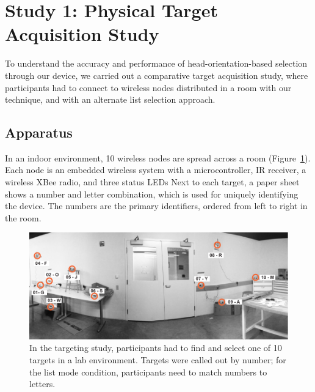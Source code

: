 \section{Study 1: Physical Target Acquisition Study}
To understand the accuracy and performance of head-orientation-based selection through our device, we carried out a comparative target acquisition study, where participants had to connect to wireless nodes distributed in a room with our technique, and with an alternate list selection approach.


\subsection{Apparatus}
In an indoor environment, 10 wireless nodes are spread across a room (Figure~\ref{fig:targeting-study-layout}). Each node is an embedded wireless system with a microcontroller, IR receiver, a wireless XBee radio, and three status LEDs %
Next to each target, a paper sheet shows a number and letter combination, which is used for uniquely identifying the device. The numbers are the primary identifiers, ordered from left to right in the room. 

\begin{figure}[t]
\centering
\includegraphics[width=1.0\columnwidth]{figures/targeting-study-layout.pdf}
\caption{In the targeting study, participants had to find and select one of 10 targets in a lab environment. Targets were called out by number; for the list mode condition, participants need to match numbers to letters.}
\label{fig:targeting-study-layout}
\end{figure}

